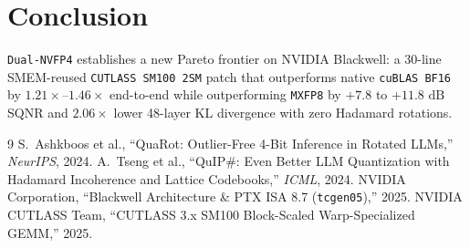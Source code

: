 \documentclass[conference,10pt]{IEEEtran}
\begin{document}
\section{Conclusion}
\texttt{Dual-NVFP4} establishes a new Pareto frontier on NVIDIA Blackwell: a 30-line SMEM-reused \texttt{CUTLASS SM100 2SM} patch that outperforms native \texttt{cuBLAS BF16} by $1.21\times$--$1.46\times$ end-to-end while outperforming \texttt{MXFP8} by $+7.8$ to $+11.8\text{ dB}$ SQNR and $2.06\times$ lower 48-layer KL divergence with zero Hadamard rotations.

\begin{thebibliography}{9}
 S.~Ashkboos et al., ``QuaRot: Outlier-Free 4-Bit Inference in Rotated LLMs,'' \emph{NeurIPS}, 2024.
 A.~Tseng et al., ``QuIP\#: Even Better LLM Quantization with Hadamard Incoherence and Lattice Codebooks,'' \emph{ICML}, 2024.
 NVIDIA Corporation, ``Blackwell Architecture \& PTX ISA 8.7 (\texttt{tcgen05}),'' 2025.
 NVIDIA CUTLASS Team, ``CUTLASS 3.x SM100 Block-Scaled Warp-Specialized GEMM,'' 2025.
\end{thebibliography}
\end{document}
